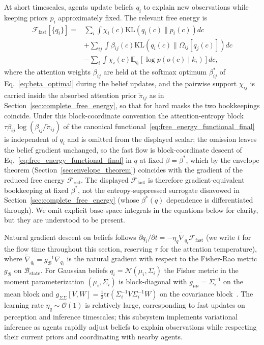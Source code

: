 \documentclass[11pt]{article}
\begin{document}
At short timescales, agents update beliefs $q_i$ to explain new observations while keeping priors $p_i$ approximately fixed. The relevant free energy is
\begin{align}
\mathcal{F}_{\text{fast}}[\{q_i\}] = {}& \sum_i \int \chi_i(c)  \mathrm{KL}(q_i(c) \| p_i(c))  dc \nonumber\\
&+ \sum_{ij} \int \beta_{ij}(c)  \mathrm{KL}(q_i(c) \| \Omega_{ij}[q_j(c)])  dc \nonumber\\
&- \sum_i \int \chi_i(c)  \mathbb{E}_{q_i}[\log p(o(c) \mid k_i)]  dc,
\end{align}
where the attention weights $\beta_{ij}$ are held at the softmax optimum $\beta^*_{ij}$ of Eq.~\eqref{eq:beta_optimal} during the belief updates, and the pairwise support $\chi_{ij}$ is carried inside the absorbed attention prior $\tilde{\pi}_{ij}$ as in Section~\ref{sec:complete_free_energy}, so that for hard masks the two bookkeepings coincide. Under this block-coordinate convention the attention-entropy block $\tau\beta_{ij}\log(\beta_{ij}/\tilde{\pi}_{ij})$ of the canonical functional~\eqref{eq:free_energy_functional_final} is independent of $q_i$ and is omitted from the displayed scalar; the omission leaves the belief gradient unchanged, so the fast flow is block-coordinate descent of Eq.~\eqref{eq:free_energy_functional_final} in $q$ at fixed $\beta = \beta^*$, which by the envelope theorem (Section~\ref{sec:envelope_theorem}) coincides with the gradient of the reduced free energy $\mathcal{F}_{\mathrm{red}}$. The displayed $\mathcal{F}_{\text{fast}}$ is therefore gradient-equivalent bookkeeping at fixed $\beta^*$, not the entropy-suppressed surrogate disavowed in Section~\ref{sec:complete_free_energy} (whose $\beta^*(q)$ dependence is differentiated through). We omit explicit base-space integrals in the equations below for clarity, but they are understood to be present.

Natural gradient descent on beliefs follows $\partial q_i/\partial t = -\eta_q  \tilde{\nabla}_{q_i} \mathcal{F}_{\text{fast}}$ (we write $t$ for the flow time throughout this section, reserving $\tau$ for the attention temperature), where $\tilde{\nabla}_{q_i} = g_{\mathcal{B}}^{-1} \nabla_{q_i}$ is the natural gradient with respect to the Fisher-Rao metric $g_{\mathcal{B}}$ on $\mathcal{B}_{\mathrm{state}}$. For Gaussian beliefs $q_i = \mathcal{N}(\mu_i, \Sigma_i)$ the Fisher metric in the moment parameterization $(\mu_i, \Sigma_i)$ is block-diagonal with $g_{\mu\mu} = \Sigma_i^{-1}$ on the mean block and $g_{\Sigma\Sigma}[V, W] = \tfrac{1}{2}\mathrm{tr}(\Sigma_i^{-1} V \Sigma_i^{-1} W)$ on the covariance block~\cite{Amari2016}. The learning rate $\eta_q \sim \mathcal{O}(1)$ is relatively large, corresponding to fast updates on perception and inference timescales; this subsystem implements variational inference as agents rapidly adjust beliefs to explain observations while respecting their current priors and coordinating with nearby agents.
\end{document}
